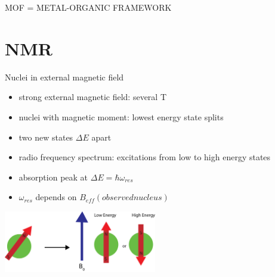 \documentclass[slovene, usenames,dvipsnames]{beamer}
\begin{document}
\begin{frame}{MOF = METAL-ORGANIC FRAMEWORK }
\begin{minipage}[]{0.5\textwidth}
\begin{minipage}[]{\textwidth}
    \end{minipage}
  \end{minipage}  
\end{frame}

\section{NMR}
\begin{frame}{Nuclei in external magnetic field}
  \begin{itemize}
   \item strong external magnetic field: several T
  \item nuclei with magnetic moment: lowest energy state splits
    \item two new states $\Delta E$ apart
   \item radio frequency spectrum: excitations from low to high energy states
   \item absorption peak at $\Delta E=\hbar \omega_{res}$
    \item $\omega_{res}$ depends on $B_{eff}(observed nucleus)$
    \end{itemize}
       \begin{minipage}[]{\textwidth}
      \centering
    \includegraphics[width=0.5\textwidth]{spin_energy_states.png}
\end{minipage}
\end{frame}
\end{document}
